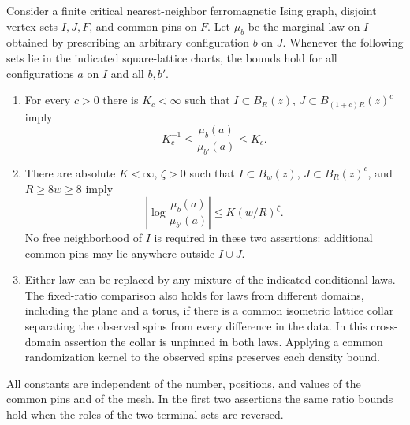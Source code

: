 \begin{proposition}
\label{prop:pure-buffered}
Consider a finite critical nearest-neighbor ferromagnetic Ising graph,
disjoint vertex sets \(I,J,F\), and common pins on \(F\). Let \(\mu_b\)
be the marginal law on \(I\) obtained by prescribing an arbitrary
configuration \(b\) on \(J\). Whenever the following sets lie in the
indicated square-lattice charts, the bounds hold for all configurations
\(a\) on \(I\) and all \(b,b'\).
\begin{enumerate}
\item For every \(c>0\) there is \(K_c<\infty\) such that
\(I\subset B_R(z)\), \(J\subset B_{(1+c)R}(z)^c\) imply
\[
 K_c^{-1}\le \frac{\mu_b(a)}{\mu_{b'}(a)}\le K_c.
\]
\item There are absolute \(K<\infty\), \(\zeta>0\) such that
\(I\subset B_w(z)\), \(J\subset B_R(z)^c\), and \(R\ge8w\ge8\)
imply
\[
 \left|\log\frac{\mu_b(a)}{\mu_{b'}(a)}\right|
 \le K(w/R)^\zeta.
\]
No free neighborhood of \(I\) is required in these two assertions:
additional common pins may lie anywhere outside \(I\cup J\).
\item Either law can be replaced by any mixture of the indicated
conditional laws. The fixed-ratio comparison also holds for laws from
different domains, including the plane and a torus, if there is a common
isometric lattice collar separating the observed spins from every
difference in the data. In this cross-domain assertion the collar is
unpinned in both laws. Applying a common randomization kernel to the
observed spins preserves each density bound.
\end{enumerate}
All constants are independent of the number, positions, and values of
the common pins and of the mesh. In the first two assertions the same
ratio bounds hold when the roles of the two terminal sets are reversed.
\end{proposition}

